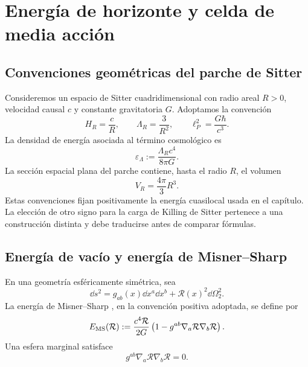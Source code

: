 \section{Energ\'ia de horizonte y celda de media acci\'on}
\label{rm:chap:horizonte-media-accion}

\subsection{Convenciones geom\'etricas del parche de Sitter}

Consideremos un espacio de Sitter cuadridimensional con radio areal
\(R>0\), velocidad causal \(c\) y constante gravitatoria \(G\). Adoptamos
la convenci\'on
\begin{equation}
 H_R=\frac cR,
 \qquad
 \Lambda_R=\frac3{R^2},
 \qquad
 \ell_P^2=\frac{G\hbar}{c^3}.
 \label{rm:eq:horizon-ds-conventions}
\end{equation}
La densidad de energ\'ia asociada al t\'ermino cosmol\'ogico es
\begin{equation}
 \varepsilon_\Lambda
 :=\frac{\Lambda_Rc^4}{8\pi G}.
 \label{rm:eq:horizon-vacuum-density}
\end{equation}
La secci\'on espacial plana del parche contiene, hasta el radio \(R\), el
volumen
\begin{equation}
 V_R=\frac{4\pi}{3}R^3.
 \label{rm:eq:horizon-flat-volume}
\end{equation}
Estas convenciones fijan positivamente la energ\'ia cuasilocal usada en el
cap\'itulo. La elecci\'on de otro signo para la carga de Killing de Sitter
pertenece a una construcci\'on distinta y debe traducirse antes de comparar
f\'ormulas.

\subsection{Energ\'ia de vac\'io y energ\'ia de Misner--Sharp}

En una geometr\'ia esf\'ericamente sim\'etrica, sea
\begin{equation}
 \dd s^2=g_{ab}(x)\dd x^a\dd x^b
 +\mathcal R(x)^2\dd\Omega_2^2.
 \label{rm:eq:horizon-spherical-metric}
\end{equation}
La energ\'ia de Misner--Sharp \cite{rm:MisnerSharp1964}, en la convenci\'on positiva adoptada, se
define por
\begin{equation}
 E_{\rm MS}(\mathcal R)
 :=\frac{c^4\mathcal R}{2G}
 \left(1-g^{ab}\nabla_a\mathcal R\nabla_b\mathcal R\right).
 \label{rm:eq:horizon-Misner-Sharp}
\end{equation}
Una esfera marginal satisface
\begin{equation}
 g^{ab}\nabla_a\mathcal R\nabla_b\mathcal R=0.
 \label{rm:eq:horizon-marginal-sphere}
\end{equation}

